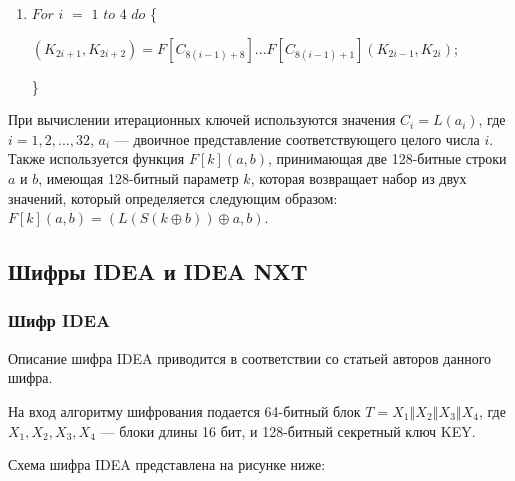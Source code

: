 \documentclass{./civarticle}
\begin{document}
\begin{itemize}
\begin{enumerate}
        \item $For$ $i$ $=$ $1$ $to$ $4$ $do$ \{ 

        \hspace{0.5cm} $(K_{2i + 1}, K_{2i + 2}) = F[C_{8(i-1) + 8}]...F[C_{8(i-1) + 1}](K_{2i-1}, K_{2i})$;
    
        \}
        
    \end{enumerate}

    При вычислении итерационных ключей используются значения $C_i = L(a_i)$, где $i = 1, 2, ..., 32$, $a_i$ --- двоичное представление соответствующего целого числа $i$. Также используется функция $F[k](a, b)$, принимающая две 128-битные строки $a$ и $b$, имеющая 128-битный параметр $k$, которая возвращает набор из двух значений, который определяется следующим образом: $F[k](a, b) = (L(S(k \oplus b)) \oplus a, b)$.
    
\end{itemize}

\subsection{Шифры IDEA и IDEA NXT}

\subsubsection{Шифр IDEA}
Описание шифра IDEA приводится в соответствии со статьей \cite{idea} авторов данного шифра.

На вход алгоритму шифрования подается 64-битный блок $T = X_1 \mathbin\Vert X_2 \mathbin\Vert X_3 \mathbin\Vert X_4$, где $X_1, X_2, X_3, X_4$ --- блоки длины 16 бит, и 128-битный секретный ключ KEY.

Схема шифра IDEA представлена на рисунке ниже:

    \begin{figure}[h!]
    \end{figure}
\end{document}
